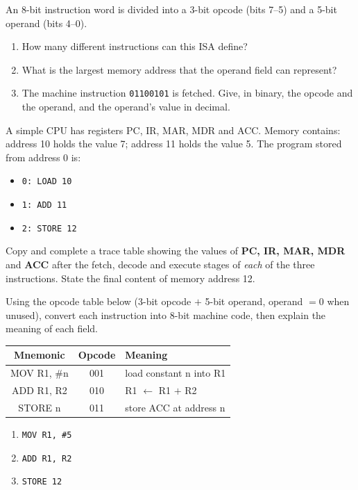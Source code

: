\documentclass[11pt]{article}
\newcommand{\cle}[1]{{\popxbold\color{popdark}#1}}
\newcounter{popsec}
\newcounter{popsub}
\newcommand{\courssub}[1]{%
  \stepcounter{popsub}%
  \par\vspace{9pt}\noindent{\popxbold\fontsize{11.5}{13}\selectfont\color{popink}{\color{poporange}\thepopsec.\thepopsub}\hspace{6pt}#1}\par\nopagebreak\vspace{4pt}
}
\begin{document}
\begin{exercice}
An 8-bit instruction word is divided into a 3-bit \cle{opcode} (bits 7--5) and a 5-bit \cle{operand} (bits 4--0).
\begin{enumerate}
\item How many different instructions can this ISA define?
\item What is the largest memory address that the operand field can represent?
\item The machine instruction \texttt{01100101} is fetched. Give, in binary, the opcode and the operand, and the operand's value in decimal.
\end{enumerate}
\end{exercice}

\courssub{I practise}

\begin{exercice}
A simple CPU has registers PC, IR, MAR, MDR and ACC. Memory contains: address 10 holds the value 7; address 11 holds the value 5. The program stored from address 0 is:
\begin{itemize}
\item[] \texttt{0: LOAD 10}
\item[] \texttt{1: ADD 11}
\item[] \texttt{2: STORE 12}
\end{itemize}
Copy and complete a trace table showing the values of \textbf{PC, IR, MAR, MDR} and \textbf{ACC} after the fetch, decode and execute stages of \emph{each} of the three instructions. State the final content of memory address 12.
\end{exercice}

\begin{exercice}
Using the opcode table below (3-bit opcode $+$ 5-bit operand, operand $=0$ when unused), convert each instruction into 8-bit machine code, then explain the meaning of each field.
\begin{center}
\begin{tabular}{|c|c|l|}
\hline
\rowcolor{popblueL} \textbf{Mnemonic} & \textbf{Opcode} & \textbf{Meaning} \\
\hline
MOV R1, \#n & 001 & load constant n into R1 \\
ADD R1, R2 & 010 & R1 $\leftarrow$ R1 $+$ R2 \\
STORE n & 011 & store ACC at address n \\
\hline
\end{tabular}
\end{center}
\begin{enumerate}
\item \texttt{MOV R1, \#5}
\item \texttt{ADD R1, R2}
\item \texttt{STORE 12}
\end{enumerate}
\end{exercice}
\end{document}
